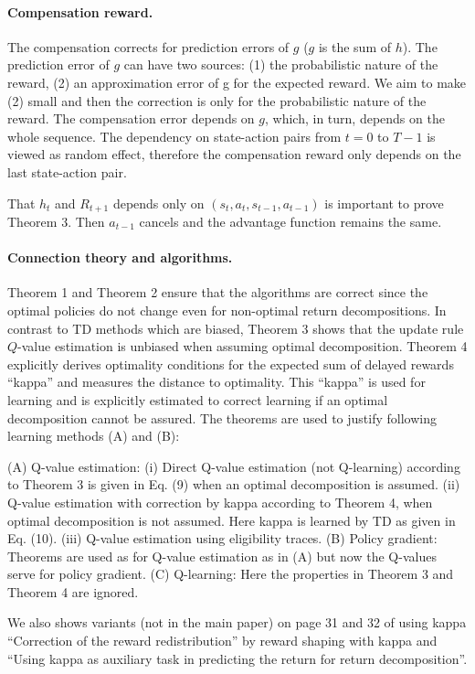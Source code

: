\documentclass{article}
\begin{document}
\begin{appendices}
\paragraph{Compensation reward.} The compensation corrects for prediction errors of $g$ ($g$ is the sum of $h$). 
The prediction error of $g$ can have two sources: 
(1) the probabilistic nature of the reward, 
(2) an approximation error of g for the expected reward. 
We aim to make (2) small and then the correction is only for the probabilistic nature of the reward.
The compensation error depends on $g$, which, in turn, depends on the whole sequence. 
The dependency on state-action pairs from $t=0$ to $T-1$ is viewed as random effect, 
therefore the compensation reward only depends on the last state-action pair. 

That $h_t$ and $R_{t+1}$ depends only on $(s_t,a_t,s_{t-1},a_{t-1})$ 
is important to prove Theorem 3. Then $a_{t-1}$ cancels and the advantage function remains the same.


\paragraph{Connection theory and algorithms.}
Theorem 1 and Theorem 2 ensure that the algorithms are correct since 
the optimal policies do not change even for non-optimal return decompositions. 
In contrast to TD methods which are biased, 
Theorem 3 shows that the update rule $Q$-value estimation 
is unbiased when assuming optimal decomposition. 
Theorem 4 explicitly derives optimality conditions 
for the expected sum of delayed rewards “kappa” 
and measures the distance to optimality. 
This “kappa” is used for learning and 
is explicitly estimated to correct learning 
if an optimal decomposition cannot be assured. 
The theorems are used to justify following learning methods (A) and (B):

(A) Q-value estimation: 
(i) Direct Q-value estimation (not Q-learning) according to Theorem 3 is given in Eq. (9) when an optimal decomposition is assumed.
(ii) Q-value estimation with correction by kappa according to Theorem 4, when optimal decomposition is not assumed. 
Here kappa is learned by TD as given in Eq. (10). (iii) Q-value estimation using eligibility traces.
(B) Policy gradient: Theorems are used as for Q-value estimation as in (A) 
but now the Q-values serve for policy gradient.
(C) Q-learning: Here the properties in Theorem 3 and Theorem 4 are ignored.

We also shows variants (not in the main paper) on page 31 and 32 of using kappa “Correction of the reward redistribution” 
by reward shaping with kappa and 
“Using kappa as auxiliary task in predicting the return for return decomposition”.


\end{appendices}
\end{document}
